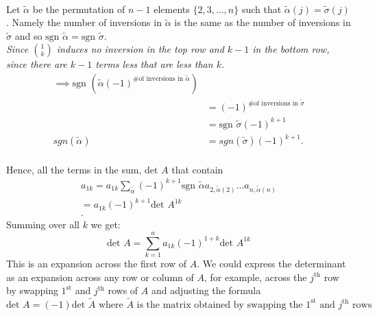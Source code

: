\documentclass{report}
\begin{document}
{      \\
      Let $ \tilde{ \alpha}   $ be the permutation of $ n-1$ elements  $ \{ 2,3,\ldots,n \}$ such that $ \tilde{ \alpha}   \left( j \right) = \tilde{ \sigma}   \left( j \right) $. Namely the number of inversions in $ \tilde{ \alpha}   $ is the same as the number of inversions in $ \tilde{ \sigma}   $ and so $ \text{sgn } \tilde{ \alpha}   =\text{sgn } \tilde{ \sigma}   $.\\
      \textit{Since $ \binom{1}{k}$ induces no inversion in the top row and $ k-1$ in the bottom row, since there are $ k-1$ terms less that are less than $ k$.}\\
 \begin{align*}
   \implies \text{sgn } \left( \tilde{ \alpha}   \left( -1 \right) ^{\text{\# of inversions in } \tilde{ \alpha}   } \right)\\
   &= \left( -1 \right) ^{\text{\# of inversions in } \tilde{ \sigma}   }\\
   &= \text{sgn } \tilde{ \sigma}   \left( -1 \right) ^{k+1}\\
   sgn \left( \tilde{ \alpha } \right) &= sgn \left( \tilde{ \sigma}    \right)  \left( -1 \right) ^{k+1}   
 .\end{align*}
            \\
Hence, all the terms in the sum, $ \text{det } A$ that contain 
\begin{align*}
        a_{1k} = a_{1k} \sum\limits_{  \tilde{ \alpha}   }^{} \left( -1 \right) ^{k+1} \text{sgn } \tilde{ \alpha}  a_{2,\tilde{ \alpha}   \left( 2 \right) }\ldots a_{n,\tilde{ \alpha}   \left( n \right) }\\
        = a_{1k} \left( -1 \right) ^{k+1} \text{det } A^{1k}\\
.\end{align*}
Summing over all $ k$ we get:
\[
        \text{det } A = \sum\limits_{k=1}^{n} a_{1k} \left( -1 \right) ^{1+k} \text{det } A^{1k}
\]
This is an expansion across the first row of $ A$. We could express the determinant as an expansion across any row or column of $ A$, for example, across the $ j^{\text{th}}$ row  by swapping $1^{\text{st}}$ and $j^{\text{th}}$ rows of $ A$ and adjusting  the formula
\[
        \text{det } A = \left( -1 \right) \text{det } \tilde{ A}   \text{ where } \tilde{ A}   \text{ is the matrix obtained by swapping the $1^{\text{st}}$ and $j^{\text{th}}$ rows} 
                              
\]}
\end{document}
